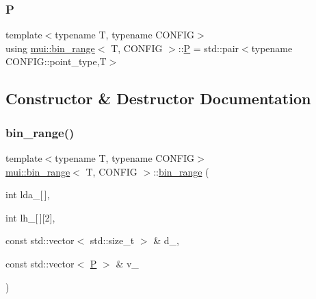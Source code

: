 \mbox{\label{structmui_1_1bin__range_af4a922fdb02454e89adce8ea9bb21f35}} 
\subsubsection{\texorpdfstring{P}{P}}
{\footnotesize\ttfamily template$<$typename T, typename C\+O\+N\+F\+IG$>$ \\
using \hyperlink{structmui_1_1bin__range}{mui\+::bin\+\_\+range}$<$ T, C\+O\+N\+F\+IG $>$\+::\hyperlink{structmui_1_1bin__range_af4a922fdb02454e89adce8ea9bb21f35}{P} =  std\+::pair$<$typename C\+O\+N\+F\+I\+G\+::point\+\_\+type,T$>$}



\subsection{Constructor \& Destructor Documentation}
\mbox{\label{structmui_1_1bin__range_a9e41a34fe6f381f3c02d216dd66efe24}} 
\subsubsection{\texorpdfstring{bin\+\_\+range()}{bin\_range()}\hspace{0.1cm}{\footnotesize\ttfamily [1/2]}}
{\footnotesize\ttfamily template$<$typename T, typename C\+O\+N\+F\+IG$>$ \\
\hyperlink{structmui_1_1bin__range}{mui\+::bin\+\_\+range}$<$ T, C\+O\+N\+F\+IG $>$\+::\hyperlink{structmui_1_1bin__range}{bin\+\_\+range} (\begin{DoxyParamCaption}\item[{int}]{lda\+\_\+\mbox{[}$\,$\mbox{]},  }\item[{int}]{lh\+\_\+\mbox{[}$\,$\mbox{]}\mbox{[}2\mbox{]},  }\item[{const std\+::vector$<$ std\+::size\+\_\+t $>$ \&}]{d\+\_\+,  }\item[{const std\+::vector$<$ \hyperlink{structmui_1_1bin__range_af4a922fdb02454e89adce8ea9bb21f35}{P} $>$ \&}]{v\+\_\+ }\end{DoxyParamCaption})\hspace{0.3cm}{\ttfamily [inline]}}

